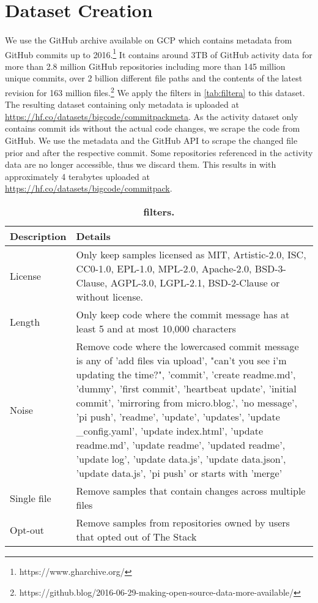\section{Dataset Creation}
\label{sec:datacreation}


\paragraph{\data} We use the GitHub archive available on GCP which contains metadata from GitHub commits up to 2016.\footnote{https://www.gharchive.org/} It contains around 3TB of GitHub activity data for more than 2.8 million GitHub repositories including more than 145 million unique commits, over 2 billion different file paths and the contents of the latest revision for 163 million files.\footnote{https://github.blog/2016-06-29-making-open-source-data-more-available/} We apply the filters in \autoref{tab:filtera} to this dataset. The resulting dataset containing only metadata is uploaded at \url{https://hf.co/datasets/bigcode/commitpackmeta}. As the activity dataset only contains commit ids without the actual code changes, we scrape the code from GitHub. We use the metadata and the GitHub API to scrape the changed file prior and after the respective commit. Some repositories referenced in the activity data are no longer accessible, thus we discard them. This results in \data{} with approximately 4 terabytes uploaded at \url{https://hf.co/datasets/bigcode/commitpack}.


\begin{table}[htbp]
\centering
\begin{tabular}{p{2cm} p{11cm}}
\toprule
\textbf{Description} & \textbf{Details} \\
\midrule
License & Only keep samples licensed as MIT, Artistic-2.0, ISC, CC0-1.0, EPL-1.0, MPL-2.0, Apache-2.0, BSD-3-Clause, AGPL-3.0, LGPL-2.1, BSD-2-Clause or without license. \\
Length & Only keep code where the commit message has at least 5 and at most 10,000 characters \\
Noise & Remove code where the lowercased commit message is any of 'add files via upload', "can't you see i'm updating the time?", 'commit', 'create readme.md', 'dummy', 'first commit', 'heartbeat update', 'initial commit', 'mirroring from micro.blog.', 'no message', 'pi push', 'readme', 'update', 'updates', 'update \_config.yaml', 'update index.html', 'update readme.md', 'update readme', 'updated readme', 'update log', 'update data.js', 'update data.json', 'update data.js', 'pi push' or starts with 'merge' \\
Single file & Remove samples that contain changes across multiple files\\
Opt-out & Remove samples from repositories owned by users that opted out of The Stack~\citep{kocetkov2022stack}\\
\bottomrule
\end{tabular}
\caption{\textbf{\data{} filters.}}
\label{tab:filtera}
\end{table}


